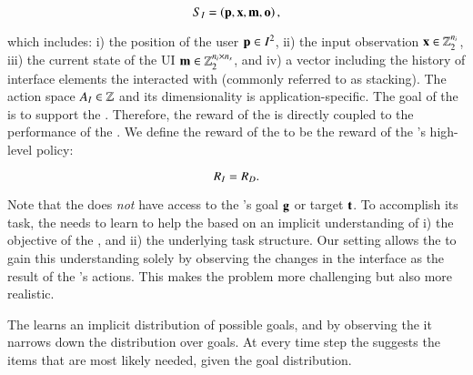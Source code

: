 \begin{equation}
    S_I = \left (\mathbf{p}, \mathbf{x}, \mathbf{m}, \mathbf{o} \right ),
    \label{eq:si}
\end{equation}

which includes: i) the position of the user $\mathbf{p} \in I^2$, ii) the input observation $\mathbf{x} \in \mathbb{Z}_2^{n_{i}}$, iii) the current state of the UI $\mathbf{m} \in \mathbb{Z}_2^{n_{i} \times n_{s}}$, and iv) a vector including the history of interface elements the \useragent interacted with (commonly referred to as stacking). The action space $A_I \in \mathbb{Z}$ and its dimensionality is application-specific. 
The goal of the \interfaceagent is to support the \useragent. Therefore, the reward of the \interfaceagent is directly coupled to the performance of the \useragent. We define the reward of the \interfaceagent to be the reward of the \useragent's high-level policy:

\begin{equation}
    R_{I} = R_{D}.
    \label{eqn:ri}
\end{equation}

Note that the \interfaceagent does \emph{not} have access to the \useragent's goal $\mathbf{g}$ or target $\mathbf{t}$. To accomplish its task, the \interfaceagent needs to learn to help the \useragent based on an implicit understanding of i) the objective of the \useragent, and ii) the underlying task structure. Our setting allows the \interfaceagent to gain this understanding solely by observing the changes in the interface as the result of the \useragent's actions. This makes the problem more challenging but also more realistic. 

The \interfaceagent learns an implicit distribution of possible goals, and by observing the \useragent it narrows down the distribution over goals. At every time step the \interfaceagent suggests the items that are most likely needed, given the goal distribution. 